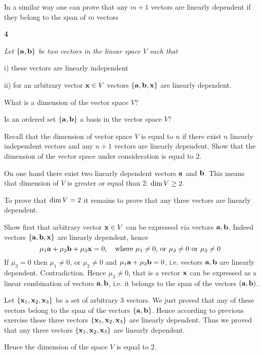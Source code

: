  In a similar way one can prove that any $m+1$ vectors are linearly dependent if they belong to the span
of $m$ vectors


\m

{\bf 4} {\it Let $\{{\bf a},{\bf b}\}$ be two vectors in the linear space $V$ such that

    i) these vectors are linearly independent

    ii) for an arbitrary vector ${\bf x}\in V$ vectors $\{{\bf a},{\bf b},{\bf x}\}$ are linearly dependent.

  What is a dimension of the vector space $V$?

    Is an ordered set $\{{\bf a},{\bf b}\}$ a basis in the vector space $V$?}


\m

   Recall that the dimension of vector space $V$ is equal to $n$ if there exist $n$ linearly independent vectors
   and any $n+1$ vectors are linearly dependent.
 Show that the dimension of the vector space under consideration is equal to $2$.

   On one hand there exist two linearly dependent vectors  ${\bf a}$ and ${\bf b}$.
    This means that dimension of $V$ is greater  or equal than 2:
${\rm dim\,} V\geq 2$.

   To prove that ${\rm dim\,} V= 2$ it remains to prove that any
three vectors are linearly dependent.

   Show first that arbitrary vector  ${\bf x}\in V$ can be expressed
   via vectors  ${\bf a}, {\bf b}$.  Indeed vectors $\{{\bf a},{\bf b},{\bf x}\}$ are linearly dependent, hence
                 $$
              \mu_1{\bf a}+\mu_2{\bf b}+\mu_3{\bf x}=0,
             \quad
             \hbox{where  $\mu_1\not=0$, or $\mu_2\not=0$ or $\mu_3\not=0$
                 }
                 $$
   If $\mu_3=0$ then $\mu_1\not=0$, or $\mu_2\not=0$ and  $\mu_1{\bf a}+\mu_2{\bf b}=0$, i.e. vectors
   ${\bf a},{\bf b}$ are linearly dependent. Contradiction. Hence $\mu_3\not=0$, that is a vector ${\bf x}$ can be expressed
   as a linear combination of vectors ${\bf a},{\bf b}$, i.e. it belongs to the span of the vectors $({\bf a},{\bf b})$.



    Let $\{{\bf x}_1,{\bf x}_2,{\bf x}_3\}$ be a set of
   arbitrary $3$ vectors.
   We just proved that any of these vectors belong to the span of the vectors $\{{\bf a},{\bf b}\}$.
    Hence according to previous exercise these three vectors
     $\{{\bf x}_1,{\bf x}_2,{\bf x}_3\}$ are linearly dependent.  Thus we proved that
     any three vectors
     $\{{\bf x}_1,{\bf x}_2,{\bf x}_3\}$ are linearly dependent.

     Hence the dimension of the space $V$ is equal to $2$.


